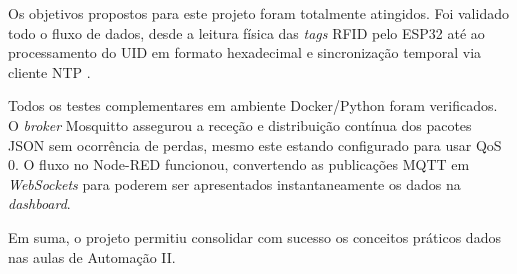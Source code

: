 \documentclass[a4paper,12pt]{article}
\begin{document}
Os objetivos propostos para este projeto foram totalmente atingidos. Foi validado todo o fluxo de dados, desde a leitura física das \textit{tags} RFID pelo ESP32 até ao processamento do UID em formato hexadecimal e sincronização temporal via cliente NTP \cite{randomnerdtutorials_esp32_ntp, paulstoffregen_time_library}.

Todos os testes complementares em ambiente Docker/Python foram verificados. O \textit{broker} Mosquitto assegurou a receção e distribuição contínua dos pacotes JSON sem ocorrência de perdas, mesmo este estando configurado para usar QoS 0. O fluxo no Node-RED funcionou, convertendo as publicações MQTT em \textit{WebSockets} para poderem ser apresentados instantaneamente os dados na \textit{dashboard}.

Em suma, o projeto permitiu consolidar com sucesso os conceitos práticos dados nas aulas de Automação II.

\newpage
\printbibliography[heading=bibintoc, title={Referências}]
\end{document}
